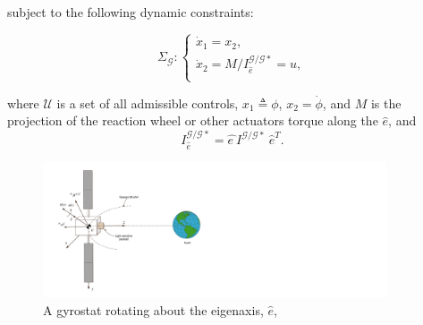 \documentclass[letterpaper, paper,12pt]{AAS}		%
\begin{document}
	subject to the following dynamic constraints:
	
	\begin{equation}\label{system}
	\Sigma_\mathcal{G}:\left\{
	\begin{array}{l}
	\dot{x}_1=x_2, \\
	\dot{x}_2=M/I_{\hat{e}}^{\mathcal{G/G*}}=u, \\
	\end{array}
	\right.
	\end{equation}
	
	where $\mathcal{U}$ is a set of all admissible controls, $x_1 \triangleq\phi$, $x_2=\dot{\phi}$, and $M$ is the projection of the reaction wheel or other actuators torque along the $\hat{e}$, and 
	\begin{equation}
	I_{\hat{e}}^{\mathcal{G/G*}}=\hat{e\ }I^{\mathcal{G/G*}}\ \hat{e}^T.
	\end{equation}
	
	\begin{figure}[H]
		\begin{center}
			\includegraphics[width=4in]{./Figures/Spacecraft_earth}  
			\caption{A gyrostat rotating about the eigenaxis, $\hat{e}$,}
			\label{s/c}
		\end{center}    
	\end{figure}
	
\end{document}

